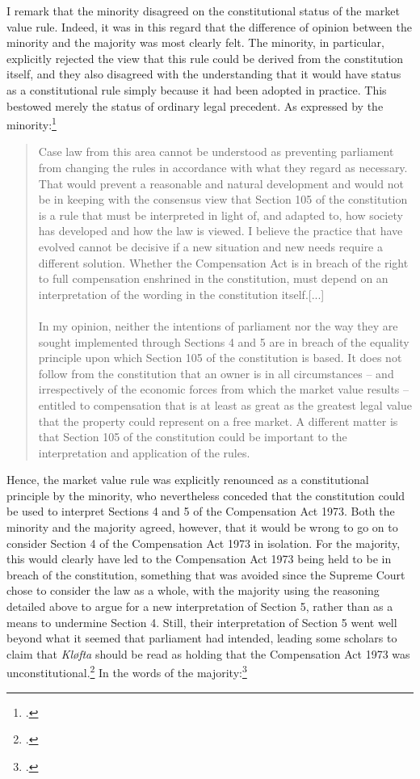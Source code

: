 I remark that the minority disagreed on the constitutional status of the market value rule. Indeed, it was in this regard that the difference of opinion between the minority and the majority was most clearly felt. The minority, in particular, explicitly rejected the view that this rule could be derived from the constitution itself, and they also disagreed with the understanding that it would have status as a constitutional rule simply because it had been adopted in practice. This bestowed merely the status of ordinary legal precedent. As expressed by the minority:\footcite[23-24]{klofta76}

\begin{quote}
Case law from this area cannot be understood as preventing parliament from changing the rules in accordance with what they regard as necessary. That would prevent a reasonable and natural development and would not be in keeping with the consensus view that Section 105 of the constitution is a rule that must be interpreted in light of, and adapted to, how society has developed and how the law is viewed. I believe the practice that have evolved cannot be decisive if a new situation and new needs require a different solution. Whether the Compensation Act is in breach of the right to full compensation enshrined in the constitution, must depend on an interpretation of the wording in the constitution itself.[...] \\ \\
In my opinion, neither the intentions of parliament nor the way they are sought implemented through Sections 4 and 5 are in breach of the equality principle upon which Section 105 of the constitution is based. It does not follow from the constitution that an owner is in all circumstances -- and irrespectively of the economic forces from which the market value results -- entitled to compensation that is at least as great as the greatest legal value that the property could represent on a free market. A different matter is that Section 105 of the constitution could be important to the interpretation and application of the rules.
\end{quote} 

Hence, the market value rule was explicitly renounced as a constitutional principle by the minority, who nevertheless conceded that the constitution could be used to interpret Sections 4 and 5 of the Compensation Act 1973. Both the minority and the majority agreed, however, that  it would be wrong to go on to consider Section 4 of the Compensation Act 1973 in isolation. For the majority, this would clearly have led to the Compensation Act 1973 being held to be in breach of the constitution, something that was avoided since the Supreme Court chose to consider the law as a whole, with the majority using the reasoning detailed above to argue for a new interpretation of Section 5, rather than as a means to undermine Section 4. Still, their interpretation of Section 5 went well beyond what it seemed that parliament had intended, leading some scholars to claim that \emph{Kløfta} should be read as holding that the Compensation Act 1973 was unconstitutional.\footcite[477]{andenes86} In the words of the majority:\footcite[12-13]{klofta76}

